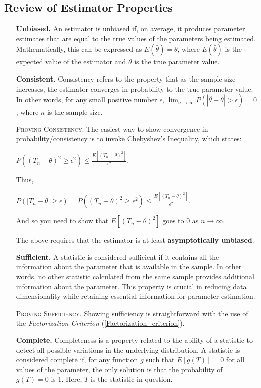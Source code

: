 \documentclass{tufte-handout}
\begin{document}
  \subsection{Review of Estimator Properties}
    \label{sub:Review of Estimator Properties}
    \begin{enumerate}
  \item[\bf Unbiased.] An estimator is unbiased if, on average, it produces parameter estimates that are equal to the true values of the parameters being estimated. Mathematically, this can be expressed as \(E(\hat{\theta}) = \theta\), where \(E(\hat{\theta})\) is the expected value of the estimator and \(\theta\) is the true parameter value.

  \item[\bf Consistent.] Consistency refers to the property that as the sample size increases, the estimator converges in probability to the true parameter value. In other words, for any small positive number \(\epsilon\), \(\lim_{{n \to \infty}} P(|\hat{\theta} - \theta| > \epsilon) = 0\), where \(n\) is the sample size. 

    \textsc{Proving Consistency.} The easiest way to show convergence in probability/consistency is to invoke Chebyshev's Inequality, which states:

      $P((T_n - \theta)^2\geq \epsilon^2)\leq \frac{E[(T_n - \theta)^2]}{\epsilon^2}$.

Thus, 

      $P(|T_n - \theta|\geq \epsilon)=P((T_n - \theta)^2\geq \epsilon^2)\leq \frac{E[(T_n - \theta)^2]}{\epsilon^2}$.

      And so you need to show that $E[(T_n - \theta)^2]$ goes to 0 as $n\rightarrow\infty$.
\begin{remark} 
  The above requires that the estimator is at least \textbf{asymptotically unbiased}.
\end{remark}
  

  \item[\bf Sufficient.] A statistic is considered sufficient if it contains all the information about the parameter that is available in the sample. In other words, no other statistic calculated from the same sample provides additional information about the parameter. This property is crucial in reducing data dimensionality while retaining essential information for parameter estimation.

      \textsc{Proving Sufficiency.} Showing sufficiency is straightforward with the use of the \textit{Factorization Criterion} (\ref{Factorization_criterion}).

  \item[\bf Complete.] Completeness is a property related to the ability of a statistic to detect all possible variations in the underlying distribution. A statistic is considered complete if, for any function \(g\) such that \(E[g(T)] = 0\) for all values of the parameter, the only solution is that the probability of \(g(T) = 0\) is 1. Here, \(T\) is the statistic in question.
\end{enumerate}\newpage  
    


\end{document}
